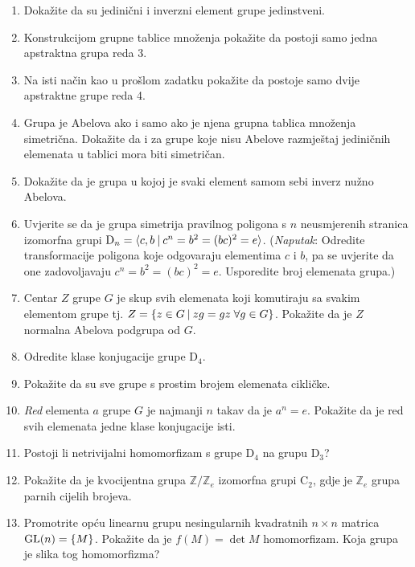 \begin{enumerate}[label=\arabic{chapter}.\arabic*.]
\item Dokažite da su jedinični i inverzni element grupe jedinstveni.
\item Konstrukcijom grupne tablice množenja pokažite da postoji samo
jedna apstraktna grupa reda 3.
\item Na isti način kao u prošlom zadatku pokažite da postoje samo
dvije apstraktne grupe reda 4.
\item Grupa je Abelova ako i samo ako je njena grupna tablica množenja simetrična.
Dokažite da i za grupe koje nisu Abelove razmještaj jediničnih elemenata u tablici
mora biti simetričan.
\item Dokažite da je grupa u kojoj je svaki element samom sebi inverz nužno Abelova.
\item Uvjerite se da je grupa simetrija pravilnog poligona s $n$ neusmjerenih
    stranica izomorfna grupi $\mathrm{D}_n=\langle c,b \: | \: c^n = b^2 = (bc)^2 = e \rangle $.
    (\emph{Naputak}: Odredite transformacije poligona koje odgovaraju elementima $c$ i
 $b$, pa se uvjerite da one zadovoljavaju $c^n = b^2 = (bc)^2 = e$. Usporedite
broj elemenata grupa.)\label{zad:Dn} 
\item \label{zad:centar} Centar $Z$ grupe $G$ je skup svih elemenata koji komutiraju sa svakim
elementom grupe tj. $Z=\{z\in G \: | \: zg=gz \; \forall g\in G\}$. Pokažite da
je $Z$ normalna Abelova podgrupa od $G$.
 
\item Odredite klase konjugacije grupe D$_4$. 
\item Pokažite da su sve grupe s prostim brojem elemenata cikličke.
\item \emph{Red} elementa $a$ grupe $G$ je najmanji $n$ takav da je $a^n=e$.
    Pokažite da je red svih elemenata jedne klase konjugacije isti.\label{zad:redel}
\item Postoji li netrivijalni homomorfizam s grupe D$_4$ na grupu D$_3$?
     
\item Pokažite da je kvocijentna grupa $\mathbb{Z}/\mathbb{Z}_e$
izomorfna grupi C$_2$, gdje je $\mathbb{Z}_e$ grupa parnih cijelih brojeva.
 
\item Promotrite opću linearnu grupu nesingularnih kvadratnih $n\times n$ 
    matrica $\mathrm{GL}(n)=\{M\}$. Pokažite da je $f(M)=\det M$ homomorfizam.
Koja grupa je slika tog homomorfizma?
\end{enumerate}
